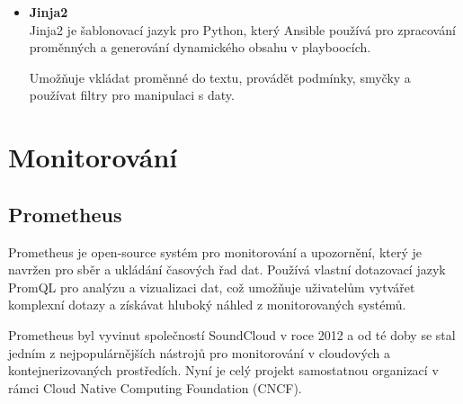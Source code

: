 \begin{itemize}
\begin{enumerate}
        \item \textbf{Fakta}\\
        Automaticky shromážděné informace o cílových uzlech, přístupné přes proměnnou \texttt{ansible\_facts}.
        
        \item \textbf{Výchozí proměnné role} \\
        Definované v \texttt{roles/myrole/defaults/main.yml}. Absolutně nejnižší priorita.
    \end{enumerate}
    
    Citlivé proměnné, jako jsou hesla nebo klíče, by měly být šifrovány pomocí Ansible Vault, což je nástroj pro zabezpečení dat v Ansible. 
    
    Ten ale zabezpečuje data jen v případě "data at rest", to znamená uložená data v souborech. 
    Jakmile jsou data během běhu playbooku dešifrována, nacházejí se v paměti a mohou být zobrazeny ve výstupu. 
    Proto je vhodné citlivé informace skrýt pomocí parametru \texttt{no\_log}, který zabrání jejich zobrazení ve výstupu playbooku.  \cite{ansibledocs}

    \item \textbf{Jinja2} \\
    Jinja2 je šablonovací jazyk pro Python, který Ansible používá pro zpracování proměnných a generování dynamického obsahu v playboocích.
    
    Umožňuje vkládat proměnné do textu, provádět podmínky, smyčky a používat filtry pro manipulaci s daty. \cite{jinja2docs}
\end{itemize}

\section{Monitorování}
\subsection{Prometheus}
Prometheus je open-source systém pro monitorování a upozornění, který je navržen pro sběr a ukládání časových řad dat.
Používá vlastní dotazovací jazyk PromQL pro analýzu a vizualizaci dat, což umožňuje uživatelům vytvářet komplexní dotazy a získávat hluboký náhled z monitorovaných systémů. \cite{prometheusdocs}

Prometheus byl vyvinut společností SoundCloud v roce 2012 a od té doby se stal jedním z nejpopulárnějších nástrojů pro monitorování v cloudových a kontejnerizovaných prostředích.
Nyní je celý projekt samostatnou organizací v rámci Cloud Native Computing Foundation (CNCF). \cite{prometheusdocs}


